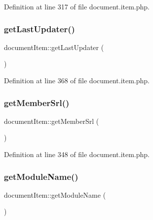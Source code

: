 Definition at line 317 of file document.\+item.\+php.

\mbox{\label{classdocumentItem_a784effc9e694d82da32e06e95482ff28}} 
\subsubsection{\texorpdfstring{get\+Last\+Updater()}{getLastUpdater()}}
{\footnotesize\ttfamily document\+Item\+::get\+Last\+Updater (\begin{DoxyParamCaption}{ }\end{DoxyParamCaption})}



Definition at line 368 of file document.\+item.\+php.

\mbox{\label{classdocumentItem_a75af5f05bd55c32bdc6c17dd8511e4e8}} 
\subsubsection{\texorpdfstring{get\+Member\+Srl()}{getMemberSrl()}}
{\footnotesize\ttfamily document\+Item\+::get\+Member\+Srl (\begin{DoxyParamCaption}{ }\end{DoxyParamCaption})}



Definition at line 348 of file document.\+item.\+php.

\mbox{\label{classdocumentItem_abc1a8bc25ecdbf936fba6e62b773b01c}} 
\subsubsection{\texorpdfstring{get\+Module\+Name()}{getModuleName()}}
{\footnotesize\ttfamily document\+Item\+::get\+Module\+Name (\begin{DoxyParamCaption}{ }\end{DoxyParamCaption})}

